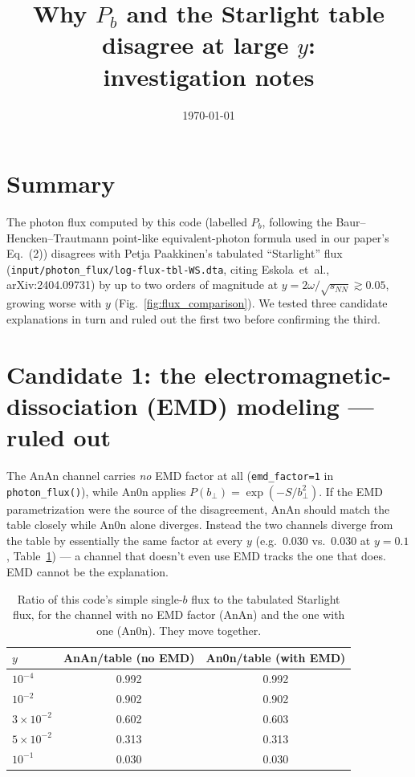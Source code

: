 \documentclass[11pt]{article}
\title{Why $P_b$ and the Starlight table disagree at large $y$:\\
investigation notes}
\author{}
\date{\today}
\begin{document}
\maketitle

\section{Summary}

The photon flux computed by this code (labelled $P_b$, following the
Baur--Hencken--Trautmann point-like equivalent-photon formula used in our
paper's Eq.~(2)) disagrees with Petja Paakkinen's tabulated ``Starlight''
flux (\texttt{input/photon\_flux/log-flux-tbl-WS.dta}, citing
Eskola~et~al., arXiv:2404.09731) by up to two orders of magnitude at
$y=2\omega/\sqrt{s_{NN}}\gtrsim0.05$, growing worse with $y$
(Fig.~\ref{fig:flux_comparison}). We tested three candidate explanations in
turn and ruled out the first two before confirming the third.

\section{Candidate 1: the electromagnetic-dissociation (EMD) modeling --- ruled out}

The AnAn channel carries \emph{no} EMD factor at all
(\texttt{emd\_factor=1} in \texttt{photon\_flux()}), while An0n applies
$P(b_\perp)=\exp(-S/b_\perp^2)$. If the EMD parametrization were the source
of the disagreement, AnAn should match the table closely while An0n alone
diverges. Instead the two channels diverge from the table by essentially
the same factor at every $y$ (e.g.\ $0.030$ vs.\ $0.030$ at $y=0.1$,
Table~\ref{tab:emd}) --- a channel that doesn't even use EMD tracks the one
that does. EMD cannot be the explanation.

\begin{table}[h]
\centering
\begin{tabular}{lcc}
\hline
$y$ & AnAn/table (no EMD) & An0n/table (with EMD) \\
\hline
$10^{-4}$ & 0.992 & 0.992 \\
$10^{-2}$ & 0.902 & 0.902 \\
$3\times10^{-2}$ & 0.602 & 0.603 \\
$5\times10^{-2}$ & 0.313 & 0.313 \\
$10^{-1}$ & 0.030 & 0.030 \\
\hline
\end{tabular}
\caption{Ratio of this code's simple single-$b$ flux to the tabulated
Starlight flux, for the channel with no EMD factor (AnAn) and the one with
one (An0n). They move together.}
\label{tab:emd}
\end{table}
\end{document}
